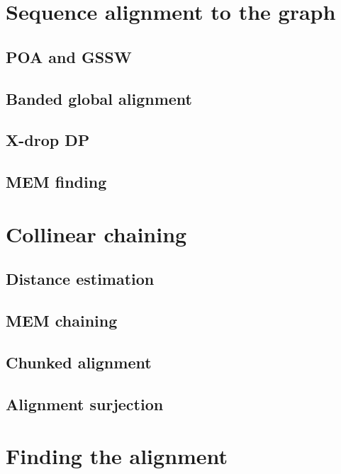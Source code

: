 \section{Sequence alignment to the graph}

\subsection{POA and GSSW}

\subsection{Banded global alignment}

\subsection{X-drop DP}

\subsection{MEM finding}


\section{Collinear chaining}

\subsection{Distance estimation}

\subsection{MEM chaining}

\subsection{Chunked alignment}

\subsection{Alignment surjection}


\section{Finding the alignment}

